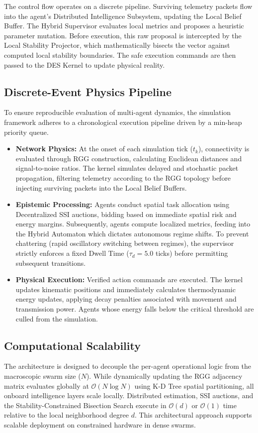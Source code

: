 \documentclass[conference]{IEEEtran}
\begin{document}
The control flow operates on a discrete pipeline. Surviving telemetry packets flow into the agent's Distributed Intelligence Subsystem, updating the Local Belief Buffer. The Hybrid Supervisor evaluates local metrics and proposes a heuristic parameter mutation. Before execution, this raw proposal is intercepted by the Local Stability Projector, which mathematically bisects the vector against computed local stability boundaries. The safe execution commands are then passed to the DES Kernel to update physical reality.

\subsection{Discrete-Event Physics Pipeline}
To ensure reproducible evaluation of multi-agent dynamics, the simulation framework adheres to a chronological execution pipeline driven by a min-heap priority queue.
\begin{itemize}
    \item \textbf{Network Physics:} At the onset of each simulation tick ($t_k$), connectivity is evaluated through RGG construction, calculating Euclidean distances and signal-to-noise ratios. The kernel simulates delayed and stochastic packet propagation, filtering telemetry according to the RGG topology before injecting surviving packets into the Local Belief Buffers.
    \item \textbf{Epistemic Processing:} Agents conduct spatial task allocation using Decentralized SSI auctions, bidding based on immediate spatial risk and energy margins. Subsequently, agents compute localized metrics, feeding into the Hybrid Automaton which dictates autonomous regime shifts. To prevent chattering (rapid oscillatory switching between regimes), the supervisor strictly enforces a fixed Dwell Time ($\tau_d = 5.0$ ticks) before permitting subsequent transitions.
    \item \textbf{Physical Execution:} Verified action commands are executed. The kernel updates kinematic positions and immediately calculates thermodynamic energy updates, applying decay penalties associated with movement and transmission power. Agents whose energy falls below the critical threshold are culled from the simulation.
\end{itemize}

\subsection{Computational Scalability}
The architecture is designed to decouple the per-agent operational logic from the macroscopic swarm size ($N$). While dynamically updating the RGG adjacency matrix evaluates globally at $\mathcal{O}(N \log N)$ using K-D Tree spatial partitioning, all onboard intelligence layers scale locally. Distributed estimation, SSI auctions, and the Stability-Constrained Bisection Search execute in $\mathcal{O}(d)$ or $\mathcal{O}(1)$ time relative to the local neighborhood degree $d$. This architectural approach supports scalable deployment on constrained hardware in dense swarms.
\end{document}
